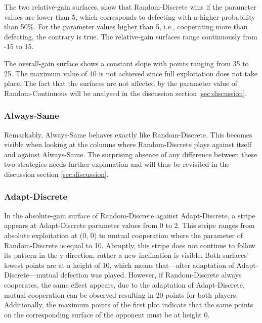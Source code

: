 \documentclass[11pt]{article}
\begin{document}
		The two relative-gain surfaces, show that Random-Discrete wins if the parameter values are lower than 5, which corresponds to defecting with a higher probability than 50\%.
		For the parameter values higher than 5, i.e., cooperating more than defecting, the contrary is true.
		The relative-gain surfaces range continuously from -15 to 15.

		The overall-gain surface shows a constant slope with points ranging from 35 to 25.
		The maximum value of 40 is not achieved since full exploitation does not take place.
		The fact that the surfaces are not affected by the parameter value of Random-Continuous will be analysed in the discussion section \ref{sec:discussion}.

\subsubsection*{Always-Same}
		Remarkably, Always-Same behaves exactly like Random-Discrete.
		This becomes visible when looking at the columns where Random-Discrete plays against itself and against Always-Same.
		The surprising absence of any difference between these two strategies needs further explanation and will thus be revisited in the discussion section \ref{sec:discussion}.

\subsubsection*{Adapt-Discrete}
		In the absolute-gain surface of Random-Discrete against Adapt-Discrete, a stripe appears at Adapt-Discrete parameter values from 0 to 2.
		This stripe ranges from absolute exploitation at (0, 0) to mutual cooperation where the parameter of Random-Discrete is equal to 10.
		Abruptly, this stripe does not continue to follow its pattern in the y-direction, rather a new inclination is visible.
		Both surfaces' lowest points are at a height of 10, which means that---after adaptation of Adapt-Discrete---mutual defection was played.
		However, if Random-Discrete always cooperates, the same effect appears, due to the adaptation of Adapt-Discrete, mutual cooperation can be observed resulting in 20 points for both players. 
		Additionally, the maximum points of the first plot indicate that the same points on the corresponding surface of the opponent must be at height 0.
\end{document}
